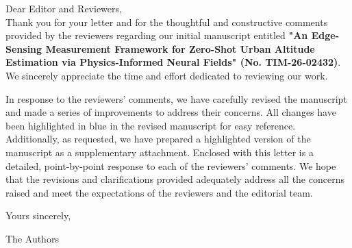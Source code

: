 

\noindent
Dear Editor and Reviewers,
\\
Thank you for your letter and for the thoughtful and constructive comments provided by the reviewers regarding our initial manuscript entitled {\color{cyan}\textbf{"An Edge-Sensing Measurement Framework for Zero-Shot Urban Altitude Estimation via Physics-Informed Neural Fields"  (No. TIM-26-02432)}}. We sincerely appreciate the time and effort dedicated to reviewing our work.

In response to the reviewers' comments, we have carefully revised the manuscript and made a series of improvements to address their concerns. All changes have been highlighted in {\color{blue}blue} in the revised manuscript for easy reference. Additionally, as requested, we have prepared a highlighted version of the manuscript as a supplementary attachment. Enclosed with this letter is a detailed, point-by-point response to each of the reviewers' comments. We hope that the revisions and clarifications provided adequately address all the concerns raised and meet the expectations of the reviewers and the editorial team.




\noindent
Yours sincerely,

\noindent
The Authors


~\\ 
~\\ 
~\\ 

\tableofcontents

\bigskip









